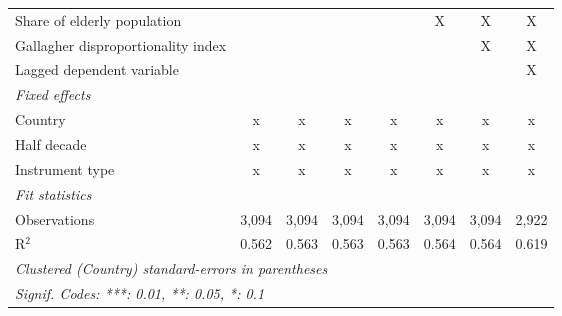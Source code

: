 \begin{tabular}{lccccccc}
   Share of elderly population                                             &              &              &              &              & X            & X            & X\\  
   Gallagher disproportionality index                                      &              &              &              &              &              & X            & X\\  
   Lagged dependent variable                                               &              &              &              &              &              &              & X\\  
   \emph{Fixed effects}\\
   Country                                                                 & x            & x            & x            & x            & x            & x            & x\\  
   Half decade                                                             & x            & x            & x            & x            & x            & x            & x\\  
   Instrument type                                                         & x            & x            & x            & x            & x            & x            & x\\  
   \midrule \emph{Fit statistics}\\
   Observations                                                            & 3,094        & 3,094        & 3,094        & 3,094        & 3,094        & 3,094        & 2,922\\  
   R$^2$                                                                   & 0.562        & 0.563        & 0.563        & 0.563        & 0.564        & 0.564        & 0.619\\  
   \midrule
   \multicolumn{8}{l}{\emph{Clustered (Country) standard-errors in parentheses}}\\
   \multicolumn{8}{l}{\emph{Signif. Codes: ***: 0.01, **: 0.05, *: 0.1}}\\
\end{tabular}
\par\endgroup



